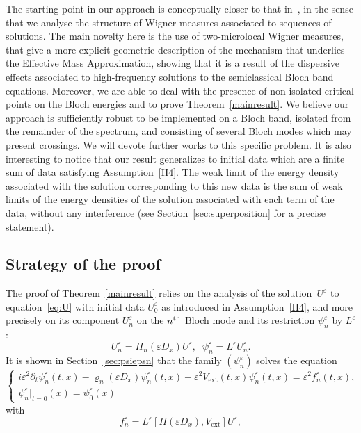 \documentclass[AHL,Unicode,longabstracts]{cedram}
\DeclareMathOperator{\ext}{ext}
\newcommand*\eps{\varepsilon}
\numberwithin{equation}{section}
\begin{document}
The starting point in our approach is conceptually closer to that in~\cite{PR96}, in the sense that we analyse the structure of Wigner measures associated to sequences of solutions. The main novelty here is the use of two-microlocal Wigner measures, that give a more explicit geometric description of the mechanism that underlies the Effective Mass Approximation, showing that it is a result of the dispersive effects associated to high-frequency solutions to the semiclassical Bloch band equations. Moreover, we are able to deal with the presence of non-isolated critical points on the Bloch energies and to prove Theorem~\ref{mainresult}. We believe our approach is sufficiently robust to be implemented on a Bloch band, isolated from the remainder of the spectrum, and consisting of several Bloch modes which may present crossings. We will devote further works to this specific problem. It is also interesting to notice that our result generalizes to initial data which are a finite sum of data satisfying Assumption~\eqref{H4}. The weak limit of the energy density associated with the solution corresponding to this new data is the sum of weak limits of the energy densities of the solution associated with each term of the data, without any interference (see Section~\ref{sec:superposition} for a precise statement).



\subsection{Strategy of the proof}

The proof of Theorem~\ref{mainresult} relies on the analysis of the solution~$U^\eps$ to equation~\eqref{eq:U} with initial data $U^\eps_0$ as introduced in Assumption~\eqref{H4}, and more precisely on its component $U^\eps_n$ on the $n^{\rm th}$ Bloch mode and its restriction $\psi^\eps_n$ by $L^\eps$:
\[
U^\eps_n= \Pi_n(\eps D_x)U^\eps,\;\;
\psi^\eps_n = L^\eps U^\eps_n.
\]
It is shown in Section~\ref{sec:psiepsn} that the family $(\psi^\eps_n)$ solves the equation
\begin{equation}\label{eq:U_components}
\begin{cases}
i\eps^2 \partial_{t} \psi^\eps_{n} (t,x)- \varrho_{n}(\eps D_x) \psi^\eps_{n}(t,x)- \eps^2 V_{\ext}(t,x) \psi^\eps_{n}(t,x)= \eps^2 f^\eps_n(t,x),\\
\psi^\eps_{n}|_{t=0}(x)= \psi_{0}^{\eps}(x)
\end{cases}
\end{equation}
with
\[
f^\eps_n=L^\eps \left[\Pi(\eps D_x), V_{\ext}\right] U^\eps,
\]
\end{document}
